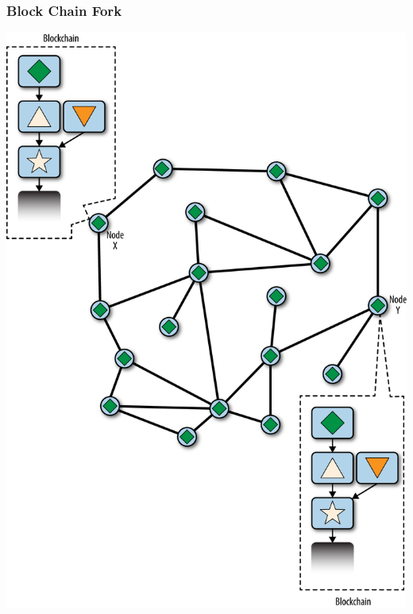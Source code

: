 \begin{frame}
    \frametitle{Block Chain Fork}
    \includegraphics[scale=0.5]{./figures/mbc2_1006.png}
\end{frame}

